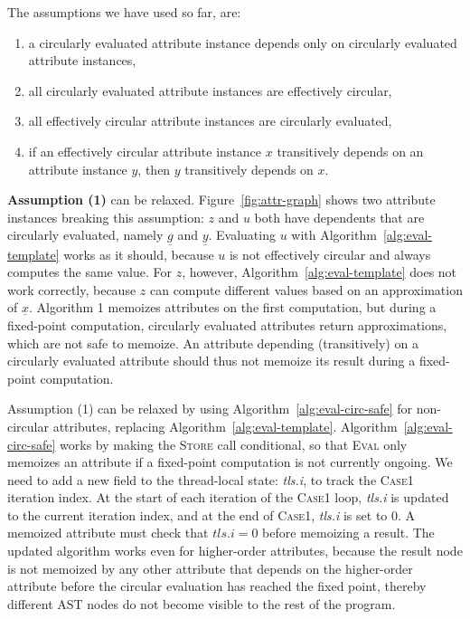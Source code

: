 {The assumptions we have used so far, are:

\begin{enumerate}
  \item a circularly evaluated attribute instance
    depends only on circularly evaluated attribute instances,
  \item all circularly evaluated attribute instances are effectively circular,
  \item all effectively circular attribute instances are circularly evaluated,
  \item if an effectively circular attribute instance $x$ transitively depends on an attribute
    instance $y$, then $y$ transitively depends on $x$.
\end{enumerate}



\textbf{Assumption (1)} can be relaxed. Figure~\ref{fig:attr-graph}
shows two attribute instances breaking this assumption:
$z$ and $u$ both have dependents that are circularly evaluated,
namely $\underline{g}$ and $\underline{y}$.
Evaluating $u$ with Algorithm~\ref{alg:eval-template} works as it should,
because $u$ is not effectively circular and always computes the same value.
For $z$, however, Algorithm~\ref{alg:eval-template} does not work correctly,
because $z$ can compute different values based on an approximation of $\underline{x}$.
Algorithm 1 memoizes attributes on the first computation, but during a fixed-point computation,
circularly evaluated attributes return approximations, which are not safe to memoize.
An attribute depending (transitively) on a circularly evaluated attribute should thus not memoize
its result during a fixed-point computation.

Assumption (1) can be relaxed by using Algorithm~\ref{alg:eval-circ-safe}
for non-circular attributes, replacing Algorithm~\ref{alg:eval-template}.
Algorithm~\ref{alg:eval-circ-safe} works by making the \textsc{Store} call
conditional, so that
\textsc{Eval} only memoizes an attribute if a fixed-point computation is not currently ongoing.
We need to add a new field to the
thread-local state: \emph{tls.i}, to track the \textsc{Case1} iteration index.
At the start of
each iteration of the \textsc{Case1} loop, \emph{tls.i} is updated to the current iteration
index,
and at the end of \textsc{Case1}, \emph{tls.i} is set to $0$.
A memoized attribute must check that $\mathit{tls}.i = 0$ before memoizing a result.
The updated algorithm works even for higher-order attributes, because the result node
is not memoized by any other attribute that depends on the higher-order attribute
before the circular evaluation has reached the fixed point, thereby different AST nodes
do not become visible to the rest of the program.

}
